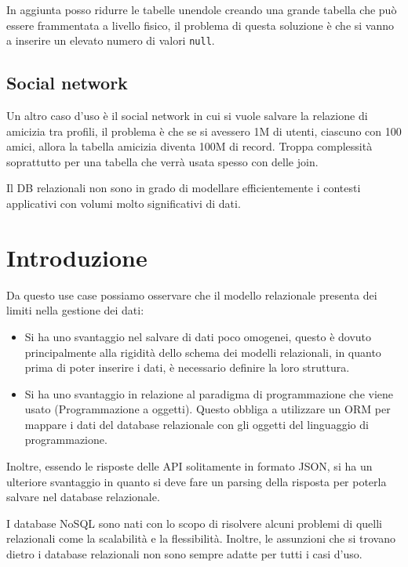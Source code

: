 In aggiunta posso ridurre le tabelle unendole creando una grande tabella che può 
essere frammentata a livello fisico, il problema di questa soluzione è che si 
vanno a inserire un elevato numero di valori \texttt{null}.
\subsection*{Social network}
Un altro caso d'uso è il social network in cui si vuole salvare la relazione di
amicizia tra profili, il problema è che se si avessero 1M di utenti, ciascuno con
100 amici, allora la tabella amicizia diventa 100M di record. Troppa complessità
soprattutto per una tabella che verrà usata spesso con delle join.

Il DB relazionali non sono in grado di modellare efficientemente i contesti applicativi
con volumi molto significativi di dati.
\section{Introduzione}
Da questo use case possiamo osservare che il modello relazionale presenta dei
limiti nella gestione dei dati:
\begin{itemize}
      \item Si ha uno svantaggio nel salvare di dati poco omogenei, questo è dovuto
            principalmente alla rigidità dello schema dei modelli relazionali, in
            quanto prima di poter inserire i dati, è necessario definire la loro
            struttura.
      \item Si ha uno svantaggio in relazione al paradigma di programmazione che
            viene usato (Programmazione a oggetti). Questo obbliga a utilizzare
            un ORM per mappare i dati del database relazionale con gli oggetti
            del linguaggio di programmazione.
\end{itemize}
Inoltre, essendo le risposte delle API solitamente in formato JSON, si ha un
ulteriore svantaggio in quanto si deve fare un parsing della risposta per
poterla salvare nel database relazionale.

I database NoSQL sono nati con lo scopo di risolvere alcuni problemi di quelli
relazionali come la scalabilità e la flessibilità. Inoltre, le assunzioni che
si trovano dietro i database relazionali non sono sempre adatte per tutti i
casi d'uso.

